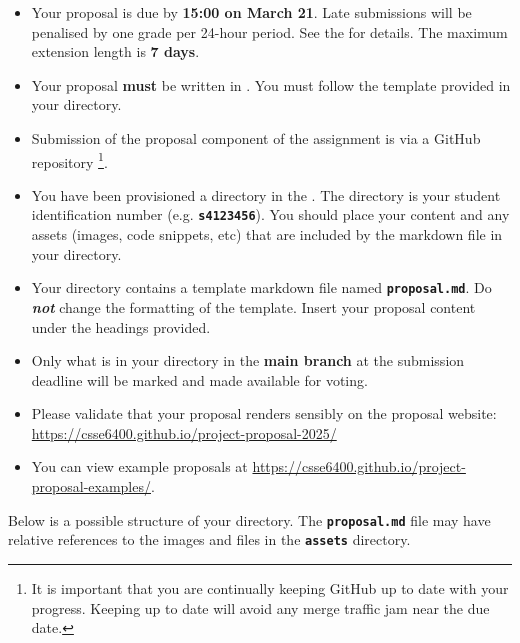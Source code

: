 \documentclass{csse4400}
\begin{document}
\begin{itemize}[topsep=4pt,partopsep=1pt,itemsep=5pt,parsep=2pt]
    \item Your proposal is due by \textbf{15:00 on March 21}.
          Late submissions will be penalised by one grade per 24-hour period.
          See the 
          for details.
          The maximum extension length is \textbf{7 days}.
    \item Your proposal \textbf{must} be written in .
          You must follow the template provided in your directory.
    \item Submission of the proposal component of the assignment is via a GitHub repository%
          \footnote{It is important that you are continually keeping GitHub up to date with your progress.
                    Keeping up to date will avoid any merge traffic jam near the due date.}.
    \item You have been provisioned a directory in the
          .
          The directory is your student identification number (e.g. \textbf{\texttt{s4123456}}).
          You should place your content and any assets (images, code snippets, etc)
          that are included by the markdown file in your directory.
    \item Your directory contains a template markdown file named \textbf{\texttt{proposal.md}}.
          Do \textbf{\textit{not}} change the formatting of the template.
          Insert your proposal content under the headings provided.
    \item Only what is in your directory in the \textbf{main branch} at the submission deadline
          will be marked and made available for voting.
    \item Please validate that your proposal renders sensibly on the proposal website:\\
          \url{https://csse6400.github.io/project-proposal-2025/}
    \item You can view example proposals at \url{https://csse6400.github.io/project-proposal-examples/}.
\end{itemize}

\begin{samepage}
\noindent
Below is a possible structure of your directory.
The \textbf{\texttt{proposal.md}} file may have relative references to the images and files in the \textbf{\texttt{assets}} directory.
\end{samepage}
\end{document}

